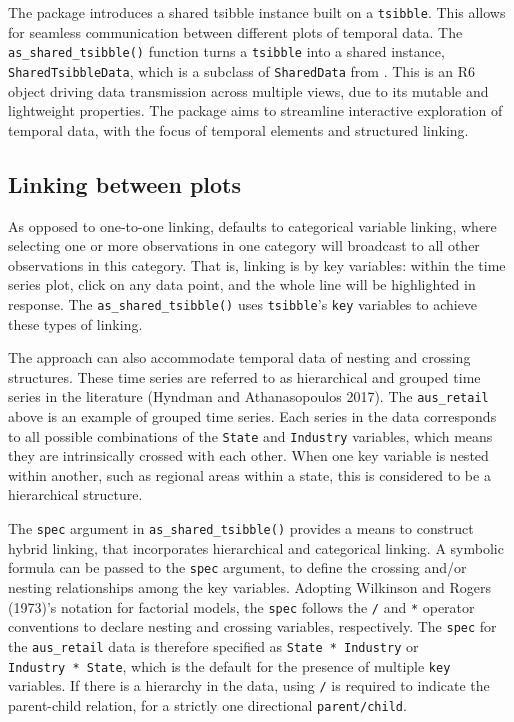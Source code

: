 The  package introduces a shared tsibble instance built on a \texttt{tsibble}. This allows for seamless communication between different plots of temporal data. The \texttt{as\_shared\_tsibble()} function turns a \texttt{tsibble} into a shared instance, \texttt{SharedTsibbleData}, which is a subclass of \texttt{SharedData} from . This is an R6 object driving data transmission across multiple views, due to its mutable and lightweight properties. The  package aims to streamline interactive exploration of temporal data, with the focus of temporal elements and structured linking.

\hypertarget{linking-between-plots}{%
\subsection{Linking between plots}\label{linking-between-plots}}

As opposed to one-to-one linking,  defaults to categorical variable linking, where selecting one or more observations in one category will broadcast to all other observations in this category. That is, linking is by key variables: within the time series plot, click on any data point, and the whole line will be highlighted in response. The \texttt{as\_shared\_tsibble()} uses \texttt{tsibble}'s \texttt{key} variables to achieve these types of linking.

The approach can also accommodate temporal data of nesting and crossing structures. These time series are referred to as hierarchical and grouped time series in the literature (Hyndman and Athanasopoulos 2017). The \texttt{aus\_retail} above is an example of grouped time series. Each series in the data corresponds to all possible combinations of the \texttt{State} and \texttt{Industry} variables, which means they are intrinsically crossed with each other. When one key variable is nested within another, such as regional areas within a state, this is considered to be a hierarchical structure.

The \texttt{spec} argument in \texttt{as\_shared\_tsibble()} provides a means to construct hybrid linking, that incorporates hierarchical and categorical linking. A symbolic formula can be passed to the \texttt{spec} argument, to define the crossing and/or nesting relationships among the key variables. Adopting Wilkinson and Rogers (1973)'s notation for factorial models, the \texttt{spec} follows the \texttt{/} and \texttt{*} operator conventions to declare nesting and crossing variables, respectively. The \texttt{spec} for the \texttt{aus\_retail} data is therefore specified as \texttt{State\ *\ Industry} or \texttt{Industry\ *\ State}, which is the default for the presence of multiple \texttt{key} variables. If there is a hierarchy in the data, using \texttt{/} is required to indicate the parent-child relation, for a strictly one directional \texttt{parent/child}.

